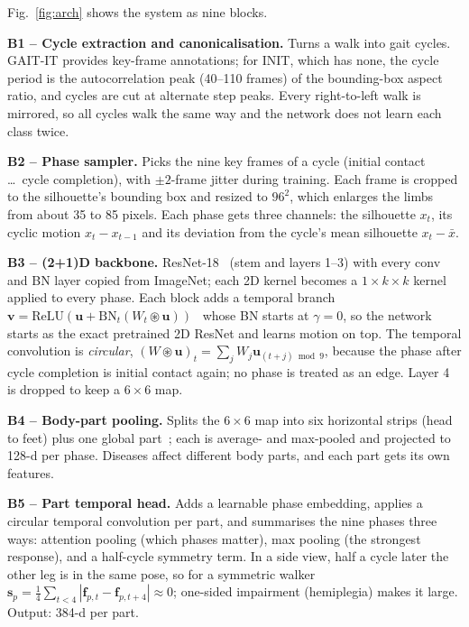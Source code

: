 \documentclass[conference]{IEEEtran}
\begin{document}
Fig.~\ref{fig:arch} shows the system as nine blocks.

\textbf{B1 -- Cycle extraction and canonicalisation.} Turns a walk into gait
cycles. GAIT-IT provides key-frame annotations; for INIT, which has none, the
cycle period is the autocorrelation peak (40--110 frames) of the bounding-box
aspect ratio, and cycles are cut at alternate step peaks. Every right-to-left
walk is mirrored, so all cycles walk the same way and the network does not
learn each class twice.

\textbf{B2 -- Phase sampler.} Picks the nine key frames of a cycle (initial
contact \dots\ cycle completion), with $\pm2$-frame jitter during training.
Each frame is cropped to the silhouette's bounding box and resized to $96^2$,
which enlarges the limbs from about 35 to 85 pixels. Each phase gets three
channels: the silhouette $x_t$, its cyclic motion $x_t-x_{t-1}$ and its
deviation from the cycle's mean silhouette $x_t-\bar x$.

\textbf{B3 -- (2+1)D backbone.} ResNet-18~\cite{he2016resnet} (stem and
layers 1--3) with every conv and BN layer copied from ImageNet; each 2D kernel
becomes a $1{\times}k{\times}k$ kernel applied to every phase. Each block adds a
temporal branch $\mathbf{v}=\mathrm{ReLU}(\mathbf{u}+\mathrm{BN}_t(W_t\circledast
\mathbf{u}))$~\cite{tran2018r21d} whose BN starts at $\gamma=0$, so the network
starts as the exact pretrained 2D ResNet and learns motion on top. The temporal
convolution is \emph{circular}, $(W\circledast\mathbf{u})_t=\sum_j
W_j\mathbf{u}_{(t+j)\bmod 9}$, because the phase after cycle completion is
initial contact again; no phase is treated as an edge. Layer 4 is dropped to
keep a $6\times6$ map.

\textbf{B4 -- Body-part pooling.} Splits the $6\times6$ map into six horizontal
strips (head to feet) plus one global part~\cite{chao2019gaitset}; each is
average- and max-pooled and projected to 128-d per phase. Diseases affect
different body parts, and each part gets its own features.

\textbf{B5 -- Part temporal head.} Adds a learnable phase embedding, applies a
circular temporal convolution per part, and summarises the nine phases three
ways: attention pooling (which phases matter), max pooling (the strongest
response), and a half-cycle symmetry term. In a side view, half a cycle later
the other leg is in the same pose, so for a symmetric walker
$\mathbf{s}_p=\frac14\sum_{t<4}|\mathbf{f}_{p,t}-\mathbf{f}_{p,t+4}|\approx0$;
one-sided impairment (hemiplegia) makes it large. Output: 384-d per part.
\end{document}
